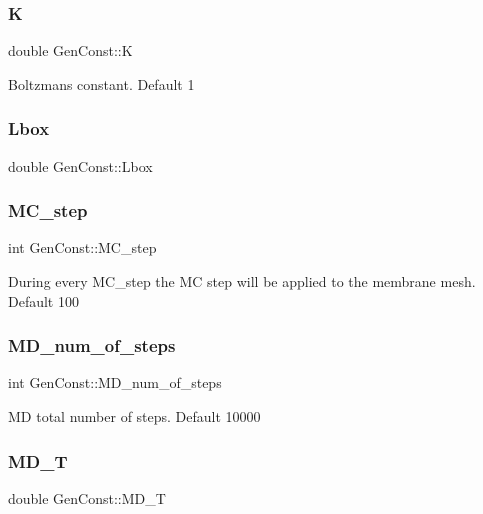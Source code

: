 \subsubsection{\texorpdfstring{K}{K}}
{\footnotesize\ttfamily double Gen\+Const\+::K}

Boltzman\textquotesingle{}s constant. Default 1 \mbox{\label{namespaceGenConst_a4d02aacef0ace9dedc9612fa17da3881}} 
\subsubsection{\texorpdfstring{Lbox}{Lbox}}
{\footnotesize\ttfamily double Gen\+Const\+::\+Lbox}

\mbox{\label{namespaceGenConst_aac99dcb054b423a41800b8cabed53f75}} 
\subsubsection{\texorpdfstring{MC\_step}{MC\_step}}
{\footnotesize\ttfamily int Gen\+Const\+::\+M\+C\+\_\+step}

During every \textquotesingle{}M\+C\+\_\+step\textquotesingle{} the MC step will be applied to the membrane mesh. Default 100 \mbox{\label{namespaceGenConst_a58312afaa32dc266f031e5fb7752ba78}} 
\subsubsection{\texorpdfstring{MD\_num\_of\_steps}{MD\_num\_of\_steps}}
{\footnotesize\ttfamily int Gen\+Const\+::\+M\+D\+\_\+num\+\_\+of\+\_\+steps}

MD total number of steps. Default 10000 \mbox{\label{namespaceGenConst_ae4fd28941bbc23f551687bc507c5bde7}} 
\subsubsection{\texorpdfstring{MD\_T}{MD\_T}}
{\footnotesize\ttfamily double Gen\+Const\+::\+M\+D\+\_\+T}

